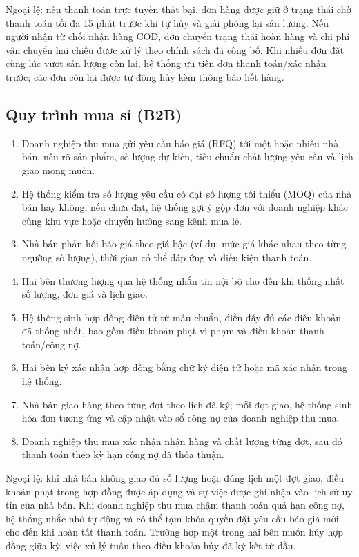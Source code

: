 Ngoại lệ: nếu thanh toán trực tuyến thất bại, đơn hàng được giữ ở trạng thái chờ thanh toán tối đa 15 phút trước khi tự hủy và giải phóng lại sản lượng. Nếu người nhận từ chối nhận hàng COD, đơn chuyển trạng thái hoàn hàng và chi phí vận chuyển hai chiều được xử lý theo chính sách đã công bố. Khi nhiều đơn đặt cùng lúc vượt sản lượng còn lại, hệ thống ưu tiên đơn thanh toán/xác nhận trước; các đơn còn lại được tự động hủy kèm thông báo hết hàng.



\subsection{Quy trình mua sỉ (B2B)}

\begin{enumerate}
    \item Doanh nghiệp thu mua gửi yêu cầu báo giá (RFQ) tới một hoặc nhiều nhà bán, nêu rõ sản phẩm, số lượng dự kiến, tiêu chuẩn chất lượng yêu cầu và lịch giao mong muốn.
    \item Hệ thống kiểm tra số lượng yêu cầu có đạt số lượng tối thiểu (MOQ) của nhà bán hay không; nếu chưa đạt, hệ thống gợi ý gộp đơn với doanh nghiệp khác cùng khu vực hoặc chuyển hướng sang kênh mua lẻ.
    \item Nhà bán phản hồi báo giá theo giá bậc (ví dụ: mức giá khác nhau theo từng ngưỡng số lượng), thời gian có thể đáp ứng và điều kiện thanh toán.
    \item Hai bên thương lượng qua hệ thống nhắn tin nội bộ cho đến khi thống nhất số lượng, đơn giá và lịch giao.
    \item Hệ thống sinh hợp đồng điện tử từ mẫu chuẩn, điền đầy đủ các điều khoản đã thống nhất, bao gồm điều khoản phạt vi phạm và điều khoản thanh toán/công nợ.
    \item Hai bên ký xác nhận hợp đồng bằng chữ ký điện tử hoặc mã xác nhận trong hệ thống.
    \item Nhà bán giao hàng theo từng đợt theo lịch đã ký; mỗi đợt giao, hệ thống sinh hóa đơn tương ứng và cập nhật vào sổ công nợ của doanh nghiệp thu mua.
    \item Doanh nghiệp thu mua xác nhận nhận hàng và chất lượng từng đợt, sau đó thanh toán theo kỳ hạn công nợ đã thỏa thuận.
\end{enumerate}

Ngoại lệ: khi nhà bán không giao đủ số lượng hoặc đúng lịch một đợt giao, điều khoản phạt trong hợp đồng được áp dụng và sự việc được ghi nhận vào lịch sử uy tín của nhà bán. Khi doanh nghiệp thu mua chậm thanh toán quá hạn công nợ, hệ thống nhắc nhở tự động và có thể tạm khóa quyền đặt yêu cầu báo giá mới cho đến khi hoàn tất thanh toán. Trường hợp một trong hai bên muốn hủy hợp đồng giữa kỳ, việc xử lý tuân theo điều khoản hủy đã ký kết từ đầu.

